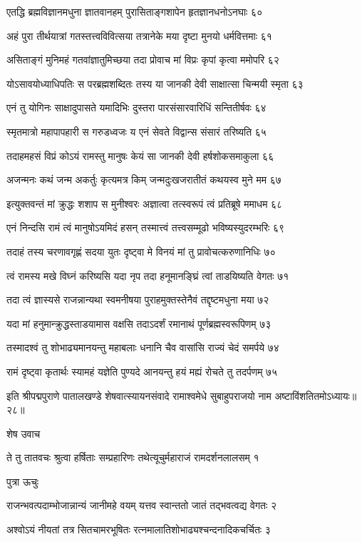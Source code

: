 एतद्धि ब्रह्मविज्ञानमधुना ज्ञातवानहम्
पुरासिताङ्गशापेन हृतज्ञानधनोऽनघाः ६०

अहं पुरा तीर्थयात्रां गतस्तत्त्वविवित्सया
तत्रानेके मया दृष्टा मुनयो धर्मवित्तमाः ६१

असिताङ्गं मुनिमहं गतवांज्ञातुमिच्छया
तदा प्रोवाच मां विप्रः कृपां कृत्वा ममोपरि ६२

योऽसावयोध्याधिपतिः स परब्रह्मशब्दितः
तस्य या जानकी देवी साक्षात्सा चिन्मयी स्मृता ६३

एनं तु योगिनः साक्षादुपासते यमादिभिः
दुस्तरा पारसंसारवारिधिं सन्तितीर्षवः ६४

स्मृतमात्रो महापापहारी स गरुडध्वजः
य एनं सेवते विद्वान्स संसारं तरिष्यति ६५

तदाहमहसं विप्रं कोऽयं रामस्तु मानुषः
केयं सा जानकी देवी हर्षशोकसमाकुला ६६

अजन्मनः कथं जन्म अकर्तुः कृत्यमत्र किम्
जन्मदुःखजरातीतं कथयस्व मुने मम ६७

इत्युक्तवन्तं मां क्रुद्धः शशाप स मुनीश्वरः
अज्ञात्वा तत्स्वरूपं त्वं प्रतिब्रूषे ममाधम ६८

एनं निन्दसि रामं त्वं मानुषोऽयमिदं हसन्
तस्मात्त्वं तत्त्वसम्मूढो भविष्यस्युदरम्भरिः ६९

तदाहं तस्य चरणावगृह्णं सदया युतः
दृष्ट्वा मे विनयं मां तु प्रावोचत्करुणानिधिः ७०

त्वं रामस्य मखे विघ्नं करिष्यसि यदा नृप
तदा हनूमानङ्घ्रिं त्वां ताडयिष्यति वेगतः ७१

तदा त्वं ज्ञास्यसे राजन्नान्यथा स्वमनीषया
पुराहमुक्तस्तेनैवं तद्दृष्टमधुना मया ७२

यदा मां हनुमान्क्रुद्धस्ताडयामास वक्षसि
तदाऽदर्शं रमानाथं पूर्णब्रह्मस्वरूपिणम् ७३

तस्मादश्वं तु शोभाढ्यमानयन्तु महाबलाः
धनानि चैव वासांसि राज्यं चेदं समर्पये ७४

रामं दृष्ट्वा कृतार्थः स्यामहं यज्ञेति पुण्यदे
आनयन्तु हयं मह्यं रोचते तु तदर्पणम् ७५

इति श्रीपद्मपुराणे पातालखण्डे शेषवात्स्यायनसंवादे रामाश्वमेधे सुबाहुपराजयो नाम अष्टाविंशतितमोऽध्यायः॥२८॥


शेष उवाच

ते तु तातवचः श्रुत्वा हर्षिताः सम्प्रहारिणः
तथेत्यूचुर्महाराजं रामदर्शनलालसम् १

पुत्रा ऊचुः

राजन्भवत्पदाम्भोजान्नान्यं जानीमहे वयम्
यत्तव स्वान्ततो जातं तद्भवत्वद्य वेगतः २

अश्वोऽयं नीयतां तत्र सितचामरभूषितः
रत्नमालातिशोभाढ्यश्चन्दनादिकचर्चितः ३

